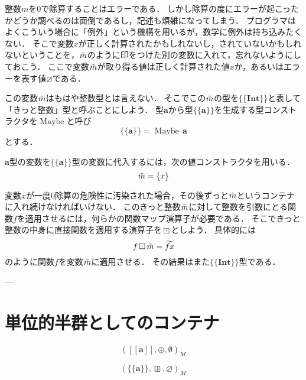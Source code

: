 \documentclass[twocolumn]{jsbook}
\def\[{[\![}
\def\]{]\!]}
\newcommand{\hsklType}[1]{\textbf{#1}}
\newcommand{\hsklTypeConstructor}[1]{\mathop{\mathrm{#1}}}
\DeclareMathOperator{\hsklMaybeConstructor}{\hsklTypeConstructor{Maybe}}
\DeclareMathOperator{\hsklMaybeAppend}{\boxplus}
\DeclareMathOperator{\hsklMaybeMap}{\boxdot}
\newcommand{\hsklAppend}{\oplus}
\newcommand{\hsklEmptyList}{\emptyset}
\newcommand{\hsklInt}{\hsklType{Int}}
\newcommand{\hsklNothing}{\varnothing}
\newcommand{\hsklJust}[1]{\{#1\}}
\newcommand{\hsklListType}[1]{\[#1\]}
\newcommand{\hsklMaybe}[1]{\Tilde{#1}}
\newcommand{\hsklMaybeW}[1]{\widetilde{#1}}
\newcommand{\hsklMaybeType}[1]{\{\!\{#1\}\!\}}
\newcommand{\hsklTypeConstruct}[2]{#1\,#2}
\newcommand{\mathMonoid}[3]{(#1,#2,#3)_\mathcal{M}}
\newcommand{\typename}[1]{\mathbf{#1}}
\newcommand{\typeconstructor}[2]{\mathop{#1}\,#2}
\newcommand{\typeint}{\typename{Int}}
\newcommand{\typemaybe}{\typename{Maybe}}
\newcommand{\constantnothing}{\varnothing}
\newcommand{\binarymaybefunctormap}{\boxdot}
\newcommand{\binarymaybeappend}{\boxplus}
\newcommand{\maybetype}[1]{\left\{#1\right\}}
\begin{document}
整数$m$を$0$で除算することはエラーである．
しかし除算の度にエラーが起こったかどうか調べるのは面倒であるし，記述も煩雑になってしまう．
プログラマはよくこういう場合に「例外」という機構を用いるが，数学に例外は持ち込みたくない．
そこで変数$x$が正しく計算されたかもしれないし，されていないかもしれないということを，$\hsklMaybe{m}$のように印をつけた別の変数に入れて，忘れないようにしておこう．
ここで変数$\hsklMaybe{m}$が取り得る値は正しく計算された値$x$か，あるいはエラーを表す値$\hsklNothing$である．

この変数$\hsklMaybe{m}$はもはや整数型とは言えない．
そこでこの$\hsklMaybe{m}$の型を$\hsklMaybeType{\hsklInt}$と表して「きっと整数」型と呼ぶことにしよう．
型$\hsklType{a}$から型$\hsklMaybeType{\hsklType{a}}$を生成する型コンストラクタを$\hsklMaybeConstructor$と呼び$$\hsklMaybeType{\hsklType{a}}=\hsklTypeConstruct{\hsklMaybeConstructor}{\hsklType{a}}$$とする．

$\hsklType{a}$型の変数を$\hsklMaybeType{\hsklType{a}}$型の変数に代入するには，次の値コンストラクタを用いる．
$$\hsklMaybe{m}=\hsklJust{x}$$

変数$x$が一度$0$除算の危険性に汚染された場合，その後ずっと$\hsklMaybe{m}$というコンテナに入れ続けなければいけない．
このきっと整数$\hsklMaybe{m}$に対して整数を引数にとる関数$f$を適用させるには，何らかの関数マップ演算子が必要である．
そこできっと整数の中身に直接関数を適用する演算子を$\hsklMaybeMap$としよう．
具体的には$$f\hsklMaybeMap\hsklMaybe{m}=\hsklMaybeW{fx}$$のように関数$f$を変数$\hsklMaybe{m}$に適用させる．
その結果はまた$\hsklMaybeType{\hsklInt}$型である．


---

\section{単位的半群としてのコンテナ}

$$\mathMonoid{\hsklListType{\hsklType{a}}}{\hsklAppend}{\hsklEmptyList}$$

$$\mathMonoid{\hsklMaybeType{\hsklType{a}}}{\hsklMaybeAppend}{\hsklNothing}$$


\end{document}
